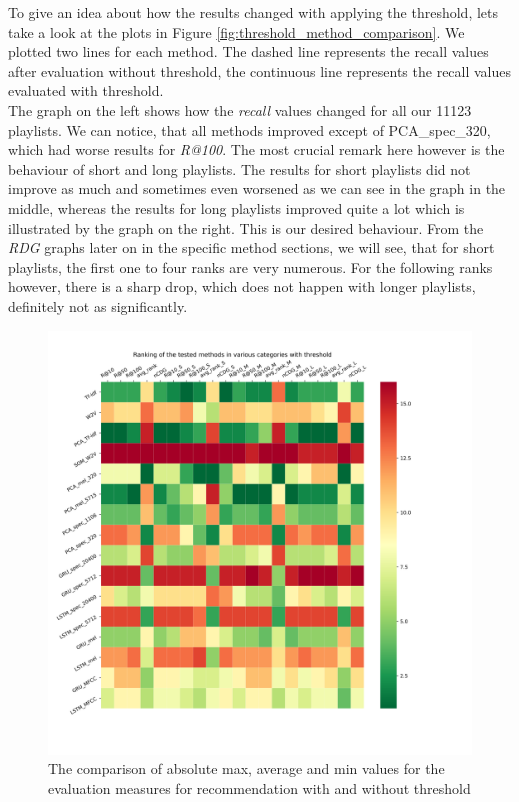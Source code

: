 To give an idea about how the results changed with applying the threshold, lets take a look at the plots in Figure \ref{fig:threshold_method_comparison}. We plotted two lines for each method. The dashed line represents the recall values after evaluation without threshold, the continuous line represents the recall values evaluated with threshold. \\
The graph on the left shows how the \textit{recall} values changed for all our 11123 playlists. We can notice, that all methods improved except of PCA\_spec\_320, which had worse results for \textit{R@100}. The most crucial remark here however is the behaviour of short and long playlists. The results for short playlists did not improve as much and sometimes even worsened as we can see in the graph in the middle, whereas the results for long playlists improved quite a lot which is illustrated by the graph on the right. This is our desired behaviour. From the \textit{RDG} graphs later on in the specific method sections, we will see, that for short playlists, the first one to four ranks are very numerous. For the following ranks however, there is a sharp drop, which does not happen with longer playlists, definitely not as significantly. \\

\begin{figure}[h!]
    \centering
	\includegraphics[width=140mm]{./img/threshold_method_ranking.png}
	\caption{The comparison of absolute max, average and min values for the evaluation measures for recommendation with and without threshold}
	\label{fig:absolute_value_comparison}
\end{figure}

